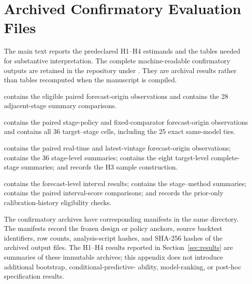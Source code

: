 \section{Archived Confirmatory Evaluation Files}
\label{app:extra_results}

The main text reports the predeclared H1--H4 estimands and the tables needed
for substantive interpretation. The complete machine-readable confirmatory
outputs are retained in the repository under
. They are archival results rather than tables
recomputed when the manuscript is compiled.

\begin{description}[leftmargin=3.2cm,style=nextline]
    \item[\textbf{H1}]
     contains the eligible paired
    forecast-origin observations and
     contains the 28 adjacent-stage
    summary comparisons.

    \item[\textbf{H2}]
     contains the paired stage-policy and
    fixed-comparator forecast-origin observations and
     contains all 36 target--stage cells,
    including the 25 exact same-model ties.

    \item[\textbf{H3}]
     contains the paired real-time and
    latest-vintage forecast-origin observations;
     contains the 36 stage-level summaries;
     contains the eight target-level
    complete-stage summaries; and
     records the H3 sample construction.

    \item[\textbf{H4}]
     contains the forecast-level interval
    results;  contains the stage--method
    summaries;  contains the paired
    interval-score comparisons; and
     records the prior-only
    calibration-history eligibility checks.
\end{description}

The confirmatory archives have corresponding manifests in the same directory.
The manifests record the frozen design or policy anchors, source backtest
identifiers, row counts, analysis-script hashes, and SHA-256 hashes of the
archived output files. The H1--H4 results reported in
Section~\ref{sec:results} are summaries of these immutable archives; this
appendix does not introduce additional bootstrap, conditional-predictive-
ability, model-ranking, or post-hoc specification results.
